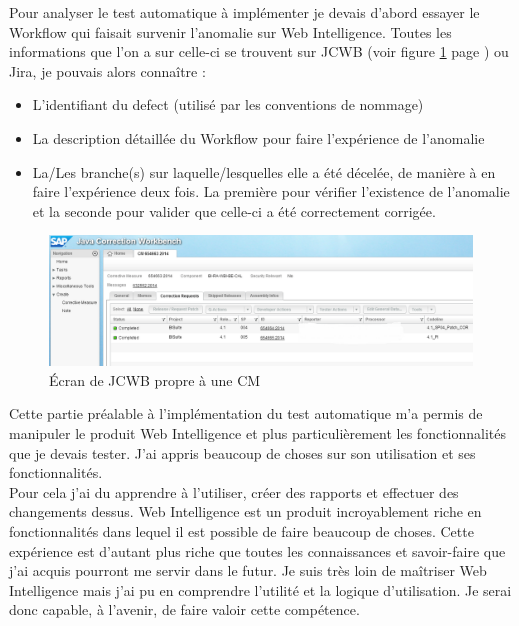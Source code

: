 Pour analyser le test automatique \`{a} impl\'{e}menter je devais d'abord essayer le \gls{Workflow} qui faisait survenir l'anomalie sur Web Intelligence. Toutes les informations que l'on a sur celle-ci se trouvent sur JCWB (voir figure \ref{figure:JCWB-CRs} page \pageref{figure:JCWB-CRs}) ou Jira, je pouvais alors conna\^{i}tre :
\begin{itemize}
	\item L'identifiant du defect (utilis\'{e} par les conventions de nommage)
	\item La description d\'{e}taill\'{e}e du \gls{Workflow} pour faire l'exp\'{e}rience de l'anomalie
	\item La/Les branche(s) sur laquelle/lesquelles elle a \'{e}t\'{e} d\'{e}cel\'{e}e, de mani\`{e}re \`{a} en faire l'exp\'{e}rience deux fois. La premi\`{e}re pour v\'{e}rifier l'existence de l'anomalie et la seconde pour valider que celle-ci a \'{e}t\'{e} correctement corrig\'{e}e.
\end{itemize}
\begin{figure}[!ht]
  \centering
      \includegraphics[width=\textwidth]{images/JCWB-CRs.png}
  \caption{\'{E}cran de JCWB propre \`{a} une CM}
	\label{figure:JCWB-CRs}
\end{figure}

Cette partie pr\'{e}alable \`{a} l'impl\'{e}mentation du test automatique m'a permis de manipuler le produit Web Intelligence et plus particuli\`{e}rement les fonctionnalit\'{e}s que je devais tester. J'ai appris beaucoup de choses sur son utilisation et ses fonctionnalit\'{e}s. \\
Pour cela j'ai du apprendre \`{a} l'utiliser, cr\'{e}er des rapports et effectuer des changements dessus. Web Intelligence est un produit incroyablement riche en fonctionnalit\'{e}s dans lequel il est possible de faire beaucoup de choses. Cette exp\'{e}rience est d'autant plus riche que toutes les connaissances et savoir-faire que j'ai acquis pourront me servir dans le futur. Je suis tr\`{e}s loin de ma\^{i}triser Web Intelligence mais j'ai pu en comprendre l'utilit\'{e} et la logique d'utilisation. Je serai donc capable, \`{a} l'avenir, de faire valoir cette comp\'{e}tence.\\

